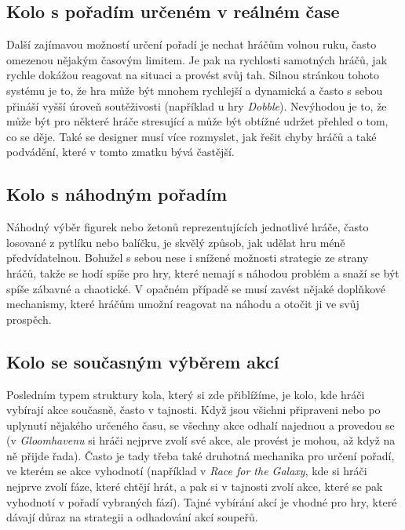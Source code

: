 \subsection{Kolo s pořadím určeném v reálném čase}
\label{subsec:turns_realtime_order}

Další zajímavou možností určení pořadí je nechat hráčům volnou ruku, často omezenou nějakým časovým limitem. Je pak na rychlosti samotných hráčů, jak rychle dokážou reagovat na situaci a provést svůj tah. Silnou stránkou tohoto systému je to, že hra může být mnohem rychlejší a dynamická a často s sebou přináší vyšší úroveň soutěživosti (například u hry \textit{Dobble}). Nevýhodou je to, že může být pro některé hráče stresující a může být obtížné udržet přehled o tom, co se děje. Také se designer musí více rozmyslet, jak řešit chyby hráčů a také podvádění, které v tomto zmatku bývá častější.

\subsection{Kolo s náhodným pořadím}
\label{subsec:turns_random_order}

Náhodný výběr figurek nebo žetonů reprezentujících jednotlivé hráče, často losované z pytlíku nebo balíčku, je skvělý způsob, jak udělat hru méně předvídatelnou. Bohužel s sebou nese i snížené možnosti strategie ze strany hráčů, takže se hodí spíše pro hry, které nemají s náhodou problém a snaží se být spíše zábavné a chaotické. V opačném případě se musí zavést nějaké doplňkové mechanismy, které hráčům umožní reagovat na náhodu a otočit ji ve svůj prospěch.

\subsection{Kolo se současným výběrem akcí}
\label{subsec:turns_action_selection_order}

Posledním typem struktury kola, který si zde přiblížíme, je kolo, kde hráči vybírají akce současně, často v tajnosti. Když jsou všichni připraveni nebo po uplynutí nějakého určeného času, se všechny akce odhalí najednou a provedou se (v \textit{Gloomhavenu} si hráči nejprve zvolí své akce, ale provést je mohou, až když na ně přijde řada). Často je tady třeba také druhotná mechanika pro určení pořadí, ve kterém se akce vyhodnotí (například v \textit{Race for the Galaxy}, kde si hráči nejprve zvolí fáze, které chtějí hrát, a pak si v tajnosti zvolí akce, které se pak vyhodnotí v pořadí vybraných fází). Tajné vybírání akcí je vhodné pro hry, které dávají důraz na strategii a odhadování akcí soupeřů.


